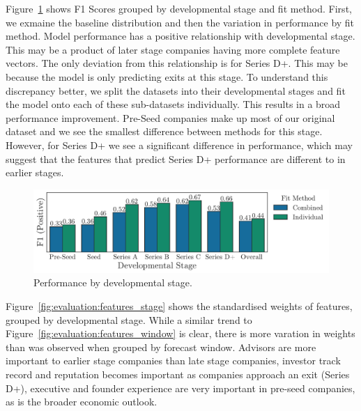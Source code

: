 \documentclass[../thesis/thesis.tex]{subfiles}
\begin{document}
Figure~\ref{fig:evaluation:performance_stage} shows F1 Scores grouped by developmental stage and fit method. First, we exmaine the baseline distribution and then the variation in performance by fit method. Model performance has a positive relationship with developmental stage. This may be a product of later stage companies having more complete feature vectors. The only deviation from this relationship is for Series D+. This may be because the model is only predicting exits at this stage. To understand this discrepancy better, we split the datasets into their developmental stages and fit the model onto each of these sub-datasets individually. This results in a broad performance improvement. Pre-Seed companies make up most of our original dataset and we see the smallest difference between methods for this stage. However, for Series D+ we see a significant difference in performance, which may suggest that the features that predict Series D+ performance are different to in earlier stages.

\begin{figure}[!htb]
    \centering
    \includegraphics[width=\textwidth]{../figures/evaluation/performance_stage}
    \caption[Performance by developmental stage]{Performance by developmental stage.}
    \label{fig:evaluation:performance_stage}
\end{figure}

Figure~\ref{fig:evaluation:features_stage} shows the standardised weights of features, grouped by developmental stage. While a similar trend to Figure~\ref{fig:evaluation:features_window} is clear, there is more varation in weights than was observed when grouped by forecast window. Advisors are more important to earlier stage companies than late stage companies, investor track record and reputation becomes important as companies approach an exit (Series D+), executive and founder experience are very important in pre-seed companies, as is the broader economic outlook.
\end{document}
